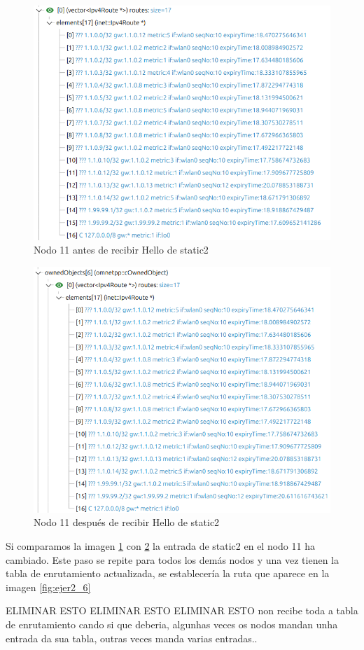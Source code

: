 \begin{figure}[H]
    \centering
    \includegraphics[width=115mm, scale=0.75]{imaxes/dsdv/ejercicio2_6_2.png}
    \caption{Nodo 11 antes de recibir Hello de static2}
    \label{fig:ejer2_6_2}
\end{figure}

\begin{figure}[H]
    \centering
    \includegraphics[width=115mm, scale=0.75]{imaxes/dsdv/ejercicio2_6_3.png}
    \caption{Nodo 11 después de recibir Hello de static2}
    \label{fig:ejer2_6_3}
\end{figure}

Si comparamos la imagen \ref{fig:ejer2_6_2} con \ref{fig:ejer2_6_3} la entrada de static2 en el nodo 11 ha cambiado. Este paso se repite para todos los demás nodos y una vez tienen la tabla de enrutamiento actualizada, se establecería la ruta que aparece en la imagen \ref{fig:ejer2_6}


ELIMINAR ESTO
ELIMINAR ESTO
ELIMINAR ESTO
non recibe toda a tabla de enrutamiento cando si que deberia, algunhas veces os nodos mandan unha entrada da sua tabla, outras veces manda varias entradas..
